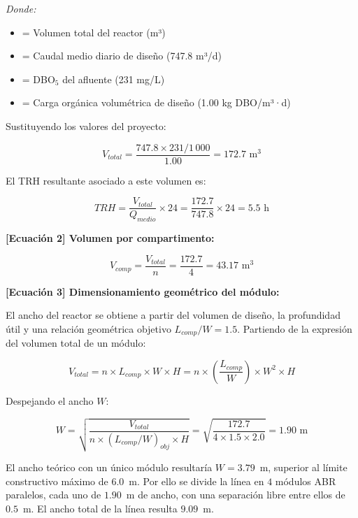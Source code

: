 \documentclass[12pt,a4paper]{article}
\begin{document}
\textit{Donde:}
\begin{itemize}[noitemsep,leftmargin=2em]
    \item[$V_{total}$] = Volumen total del reactor (m³)
    \item[$Q_{medio}$] = Caudal medio diario de diseño (747.8 m³/d)
    \item[$DBO_{entrada}$] = DBO$_5$ del afluente (231 mg/L)
    \item[$COV_{dise\~no}$] = Carga orgánica volumétrica de diseño (1.00 kg DBO/m³·d)
\end{itemize}

Sustituyendo los valores del proyecto:

\begin{equation}
V_{total} = \frac{747.8 \times 231 / 1\,000}{1.00} = 172.7 \text{ m}^3
\end{equation}

El TRH resultante asociado a este volumen es:

\begin{equation}
TRH = \frac{V_{total}}{Q_{medio}} \times 24 = \frac{172.7}{747.8} \times 24 = 5.5 \text{ h}
\end{equation}

\textbf{[Ecuación 2] Volumen por compartimento:}

\begin{equation}
V_{comp} = \frac{V_{total}}{n} = \frac{172.7}{4} = 43.17 \text{ m}^3
\end{equation}

\textbf{[Ecuación 3] Dimensionamiento geométrico del módulo:}

El ancho del reactor se obtiene a partir del volumen de diseño, la profundidad útil y una relación geométrica objetivo $L_{comp}/W = 1.5$. Partiendo de la expresión del volumen total de un módulo:

\begin{equation}
V_{total} = n \times L_{comp} \times W \times H = n \times \left( \frac{L_{comp}}{W} \right) \times W^2 \times H
\end{equation}

Despejando el ancho $W$:

\begin{equation}
W = \sqrt{\frac{V_{total}}{n \times (L_{comp}/W)_{obj} \times H}} = \sqrt{\frac{172.7}{4 \times 1.5 \times 2.0}} = 1.90 \text{ m}
\end{equation}

El ancho teórico con un único módulo resultaría $W = 3.79$~m, superior al límite constructivo máximo de $6.0$~m. Por ello se divide la línea en $4$ módulos ABR paralelos, cada uno de $1.90$~m de ancho, con una separación libre entre ellos de $0.5$~m. El ancho total de la línea resulta $9.09$~m.
\end{document}
